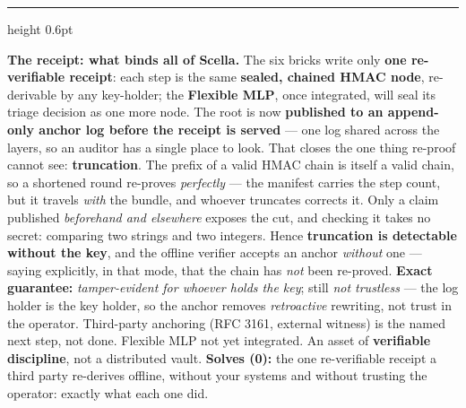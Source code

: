 \documentclass[11pt]{article}
\newcommand{\solves}[2]{{\color{efesolve}\textbf{Solves #1:} }#2\par}
\begin{document}
\vspace{3pt}
{\color{boxedge}\hrule height 0.6pt}
\vspace{3pt}
{\color{efenavy}\textbf{The receipt: what binds all of Scella.}} The six bricks write only \textbf{one
re-verifiable receipt}: each step is the same \textbf{sealed, chained HMAC node}, re-derivable by any
key-holder; the \textbf{Flexible MLP}, once integrated, will seal its triage decision as one more
node. The root is now \textbf{published to an append-only anchor log before the receipt is served}
--- one log shared across the layers, so an auditor has a single place to look. That closes the one
thing re-proof cannot see: \textbf{truncation}. The prefix of a valid HMAC chain is itself a valid
chain, so a shortened round re-proves \emph{perfectly} --- the manifest carries the step count, but
it travels \emph{with} the bundle, and whoever truncates corrects it. Only a claim published
\emph{beforehand and elsewhere} exposes the cut, and checking it takes no secret: comparing two
strings and two integers. Hence \textbf{truncation is detectable without the key}, and the offline
verifier accepts an anchor \emph{without} one --- saying explicitly, in that mode, that the chain has
\emph{not} been re-proved. \textbf{Exact guarantee:} \emph{tamper-evident for whoever holds the key};
still \emph{not trustless} --- the log holder is the key holder, so the anchor removes
\emph{retroactive} rewriting, not trust in the operator. Third-party anchoring (RFC 3161, external
witness) is the named next step, not done. Flexible MLP not yet integrated. An asset of
\textbf{verifiable discipline}, not a distributed vault.
\solves{(0)}{the one re-verifiable receipt a third party re-derives offline, without your systems and without trusting the operator: exactly what each one did.}

\vspace{5pt}
\end{document}
